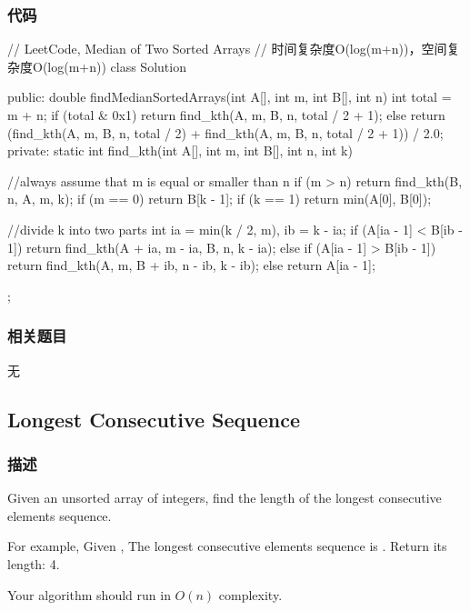 \subsubsection{代码}
\begin{Code}
// LeetCode, Median of Two Sorted Arrays
// 时间复杂度O(log(m+n))，空间复杂度O(log(m+n))
class Solution {
public:
    double findMedianSortedArrays(int A[], int m, int B[], int n) {
        int total = m + n;
        if (total & 0x1)
            return find_kth(A, m, B, n, total / 2 + 1);
        else
            return (find_kth(A, m, B, n, total / 2)
                    + find_kth(A, m, B, n, total / 2 + 1)) / 2.0;
    }
private:
    static int find_kth(int A[], int m, int B[], int n, int k) {
        //always assume that m is equal or smaller than n
        if (m > n) return find_kth(B, n, A, m, k);
        if (m == 0) return B[k - 1];
        if (k == 1) return min(A[0], B[0]);

        //divide k into two parts
        int ia = min(k / 2, m), ib = k - ia;
        if (A[ia - 1] < B[ib - 1])
            return find_kth(A + ia, m - ia, B, n, k - ia);
        else if (A[ia - 1] > B[ib - 1])
            return find_kth(A, m, B + ib, n - ib, k - ib);
        else
            return A[ia - 1];
    }
};
\end{Code}


\subsubsection{相关题目}

\begindot
\item 无
\myenddot


\subsection{Longest Consecutive Sequence} %
\label{sec:longest-consecutive-sequence}


\subsubsection{描述}
Given an unsorted array of integers, find the length of the longest consecutive elements sequence.

For example,
Given \code{[100, 4, 200, 1, 3, 2]},
The longest consecutive elements sequence is \code{[1, 2, 3, 4]}. Return its length: 4.

Your algorithm should run in $O(n)$ complexity.


